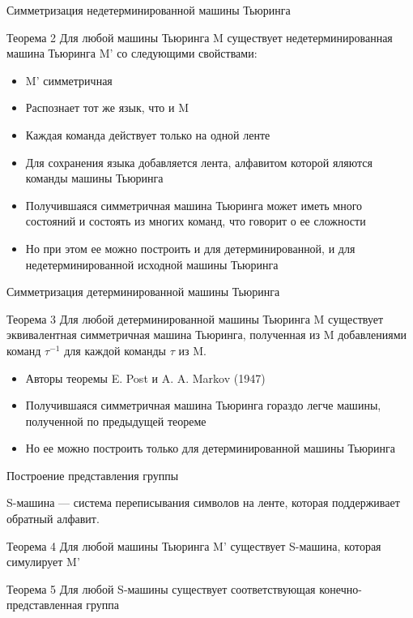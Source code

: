 \documentclass[xcolor=table]{beamer}
\begin{document}
\begin{frame}[fragile]{Симметризация недетерминированной машины Тьюринга}
\begin{block}{Теорема 2}
Для любой машины Тьюринга M существует недетерминированная машина Тьюринга M' со следующими свойствами:
    \begin{itemize}
        \item M' симметричная
        \item Распознает тот же язык, что и M
        \item Каждая команда действует только на одной ленте
    \end{itemize}
\end{block}
\begin{itemize}
    \item Для сохранения языка добавляется лента, алфавитом которой яляются команды машины Тьюринга
    \item Получившаяся симметричная машина Тьюринга может иметь много состояний и состоять из многих команд, что говорит о ее сложности 
    \item Но при этом ее можно построить и для детерминированной, и для недетерминированной исходной машины Тьюринга
\end{itemize}
\end{frame}

\begin{frame}[fragile]{Симметризация детерминированной машины Тьюринга}
    \begin{block}{Теорема 3}
    Для любой детерминированной машины Тьюринга M существует эквивалентная симметричная машина Тьюринга, полученная из M добавлениями команд $\tau^{-1}$ для каждой команды $\tau$ из M.
	\end{block}
	\begin{itemize}
	    \item Авторы теоремы E. Post и A. A. Markov (1947)
	    \item Получившаяся симметричная машина Тьюринга гораздо легче машины, полученной по предыдущей теореме
	    \item Но ее можно построить только для детерминированной машины Тьюринга
	\end{itemize}
\end{frame}

\begin{frame}[fragile]{Построение представления группы}

S-машина --- система переписывания символов на ленте, которая поддерживает обратный алфавит.

\begin{block}{Теорема 4}
Для любой машины Тьюринга M' существует S-машина, которая симулирует M'
\end{block}

\begin{block}{Теорема 5}
Для любой S-машины существует соответствующая конечно-представленная группа
\end{block}
\end{frame}
\end{document}
